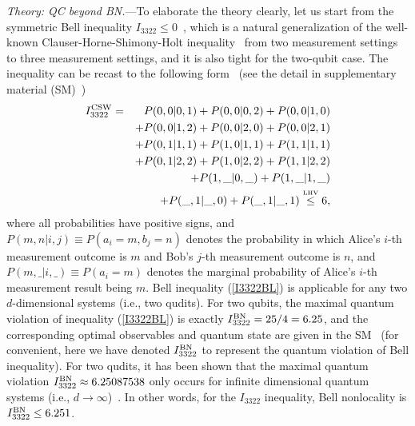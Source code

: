 \documentclass[prl,letterpaper,english,reprint,nofootinbib,aps,superscriptaddress,showpacs,showkeys]{revtex4-1}
\theoremstyle{definition}
\theoremstyle{remark}
\begin{document}

\emph{Theory: QC beyond BN.}---To elaborate the theory clearly, let us start from the symmetric Bell inequality  $I_{3322}\le 0$~\cite{BG08}, which is a natural generalization of the well-known Clauser-Horne-Shimony-Holt inequality~\cite{CHSH} from two measurement settings to three measurement settings, and it is also tight for the two-qubit case.
The inequality can be recast to the following form~\cite{RDLTC14} (see the detail in supplementary material (SM)~\cite{SM})
 \begin{eqnarray}
 I_{3322}^{\rm CSW}
 &=&P(0,0 \vert 0,1) + P(0,0 \vert 0,2) + P(0,0 \vert 1,0) \nonumber\\
 &&+ P(0,0 \vert 1,2) + P(0,0 \vert 2,0) + P(0,0 \vert 2,1) \nonumber \\
 &&+ P(0,1 \vert 1,1) + P(1,0 \vert 1,1) + P(1,1 \vert 1,1) \nonumber\\
 &&+ P(0,1 \vert 2,2) + P(1,0 \vert 2,2) + P(1,1 \vert 2,2) \nonumber \\
 &&+ P(1,\_ \vert 0,\_) +P(1,\_ \vert 1,\_)\nonumber \\
 &&  + P(\_,1 \vert \_,0)+ P(\_,1 \vert \_,1)\stackrel{\mbox{\tiny{LHV}}}{\leq}6,
\label{I3322BL}
\end{eqnarray}
where all probabilities have positive signs, and $P(m,n|i,j)\equiv P(a_i=m, b_j=n)$ denotes the probability in which Alice's $i$-th measurement outcome is $m$ and Bob's $j$-th measurement outcome is $n$, and $P(m,\_|i,\_)\equiv P(a_i=m)$ denotes the marginal probability of Alice's $i$-th measurement result being $m$. Bell inequality (\ref{I3322BL}) is applicable for any two $d$-dimensional systems (i.e., two qudits). For two qubits, the maximal quantum violation of inequality (\ref{I3322BL}) is exactly $I_{3322}^{\rm BN}=25/4=6.25$, and the corresponding optimal observables and quantum state are given in the SM~\cite{SM} (for convenient, here we have denoted $I_{3322}^{\rm BN}$ to represent the quantum violation of Bell inequality). For two qudits, it has been shown that the maximal quantum violation $I_{3322}^{\rm BN}\approx6.25087538$ only occurs for infinite dimensional quantum systems (i.e., $d\rightarrow\infty$)~\cite{Pal10}. In other words, for the $I_{3322}$ inequality, Bell nonlocality is $I_{3322}^{\rm BN}\le 6.251$.
\end{document}

